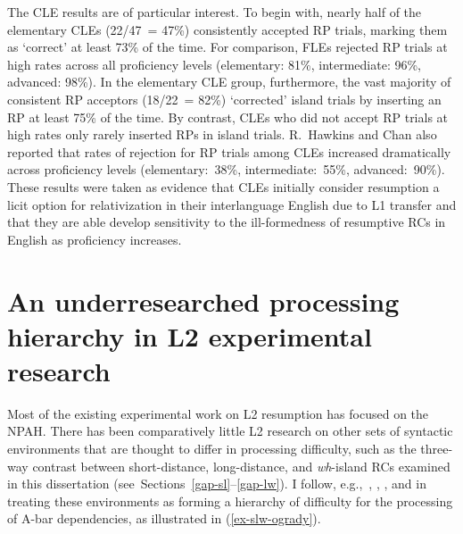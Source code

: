 The CLE results are of particular interest. To begin with, nearly half of the elementary CLEs (22/47~= 47\%) consistently accepted RP trials, marking them as `correct' at least 73\% of the time. For comparison, FLEs rejected\footnotemark{} RP trials at high rates across all proficiency levels (elementary: 81\%, intermediate: 96\%, advanced: 98\%). In the elementary CLE group, furthermore, the vast majority of consistent RP acceptors (18/22~= 82\%) `corrected' island trials by inserting an RP at least 75\% of the time. By contrast, CLEs who did not accept RP trials at high rates only rarely inserted RPs in island trials. R.~Hawkins and Chan also reported that rates of rejection for RP trials among CLEs increased dramatically across proficiency levels (elementary:~38\%, intermediate:~55\%, advanced:~90\%). These results were taken as evidence that CLEs initially consider resumption a licit option for relativization in their interlanguage English due to L1 transfer and that they are able develop sensitivity to the ill-formedness of resumptive RCs in English as proficiency increases.


\section{An underresearched processing hierarchy in L2 experimental research}\label{acq-slw}

Most of the existing experimental work on L2 resumption has focused on the NPAH. There has been comparatively little L2 research on other sets of syntactic environments that are thought to differ in processing difficulty, such as the three-way contrast between short-distance, long-distance, and \textit{wh}-island RCs examined in this dissertation (see~Sections~\ref{gap-sl}--\ref{gap-lw}). I follow, e.g.,~\textcite{hammerly2022}, \textcite{hawkins2004}, \textcite{kluender.kutas1993}, and \textcite{ogrady2022a} in treating these environments as forming a hierarchy of difficulty for the processing of A-bar dependencies, as illustrated in (\ref{ex-slw-ogrady}).\footnotemark{}


